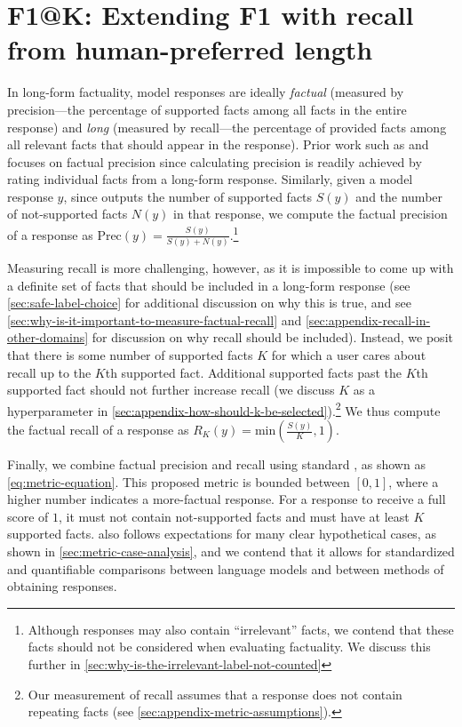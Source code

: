 \documentclass{article}
\theoremstyle{plain}
\theoremstyle{definition}
\theoremstyle{remark}
\begin{document}


\section{F1@K: Extending F1 with recall from human-preferred length}
\label{sec:main-metric}
In long-form factuality, model responses are ideally \textit{factual} (measured by precision---the percentage of supported facts among all facts in the entire response) and \textit{long} (measured by recall---the percentage of provided facts among all relevant facts that should appear in the response).
Prior work such as \citet{min2023factscore} and \citet{tian2023fine} focuses on factual precision since calculating precision is readily achieved by rating individual facts from a long-form response.
Similarly, given a model response $y$, since \safe{} outputs the number of supported facts $S(y)$ and the number of not-supported facts $N(y)$ in that response, we compute the factual precision of a response as $\text{Prec}(y) = \frac{S(y)}{S(y) + N(y)}$.\footnote{Although responses may also contain ``irrelevant'' facts, we contend that these facts should not be considered when evaluating factuality. We discuss this further in \cref{sec:why-is-the-irrelevant-label-not-counted}}

Measuring recall is more challenging, however, as it is impossible to come up with a definite set of facts that should be included in a long-form response (see \cref{sec:safe-label-choice} for additional discussion on why this is true, and see \cref{sec:why-is-it-important-to-measure-factual-recall} and \cref{sec:appendix-recall-in-other-domains} for discussion on why recall should be included).
Instead, we posit that there is some number of supported facts $K$ for which a user cares about recall up to the $K$th supported fact. 
Additional supported facts past the $K$th supported fact should not further increase recall (we discuss $K$ as a hyperparameter in \cref{sec:appendix-how-should-k-be-selected}).\footnote{Our measurement of recall assumes that a response does not contain repeating facts (see \cref{sec:appendix-metric-assumptions}).}
We thus compute the factual recall of a response as $R_K(y) = \text{min} \left( \frac{S(y)}{K}, 1 \right)$.

Finally, we combine factual precision and recall using standard \metricshort{}, as shown as \cref{eq:metric-equation}.
This proposed metric is bounded between $[0, 1]$, where a higher number indicates a more-factual response. For a response to receive a full score of $1$, it must not contain not-supported facts and must have at least $K$ supported facts.
\metric{} also follows expectations for many clear hypothetical cases, as shown in \cref{sec:metric-case-analysis}, and we contend that it allows for standardized and quantifiable comparisons between language models and between methods of obtaining responses.
\end{document}
